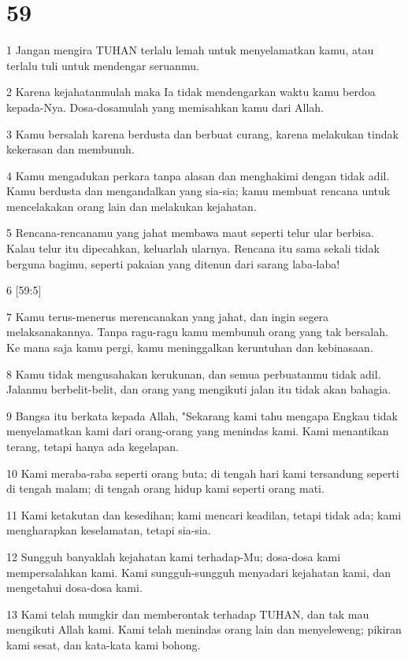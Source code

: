 \chapter{59}

\par 1 Jangan mengira TUHAN terlalu lemah untuk menyelamatkan kamu, atau terlalu tuli untuk mendengar seruanmu.
\par 2 Karena kejahatanmulah maka Ia tidak mendengarkan waktu kamu berdoa kepada-Nya. Dosa-dosamulah yang memisahkan kamu dari Allah.
\par 3 Kamu bersalah karena berdusta dan berbuat curang, karena melakukan tindak kekerasan dan membunuh.
\par 4 Kamu mengadukan perkara tanpa alasan dan menghakimi dengan tidak adil. Kamu berdusta dan mengandalkan yang sia-sia; kamu membuat rencana untuk mencelakakan orang lain dan melakukan kejahatan.
\par 5 Rencana-rencanamu yang jahat membawa maut seperti telur ular berbisa. Kalau telur itu dipecahkan, keluarlah ularnya. Rencana itu sama sekali tidak berguna bagimu, seperti pakaian yang ditenun dari sarang laba-laba!
\par 6 [59:5]
\par 7 Kamu terus-menerus merencanakan yang jahat, dan ingin segera melaksanakannya. Tanpa ragu-ragu kamu membunuh orang yang tak bersalah. Ke mana saja kamu pergi, kamu meninggalkan keruntuhan dan kebinasaan.
\par 8 Kamu tidak mengusahakan kerukunan, dan semua perbuatanmu tidak adil. Jalanmu berbelit-belit, dan orang yang mengikuti jalan itu tidak akan bahagia.
\par 9 Bangsa itu berkata kepada Allah, "Sekarang kami tahu mengapa Engkau tidak menyelamatkan kami dari orang-orang yang menindas kami. Kami menantikan terang, tetapi hanya ada kegelapan.
\par 10 Kami meraba-raba seperti orang buta; di tengah hari kami tersandung seperti di tengah malam; di tengah orang hidup kami seperti orang mati.
\par 11 Kami ketakutan dan kesedihan; kami mencari keadilan, tetapi tidak ada; kami mengharapkan keselamatan, tetapi sia-sia.
\par 12 Sungguh banyaklah kejahatan kami terhadap-Mu; dosa-dosa kami mempersalahkan kami. Kami sungguh-sungguh menyadari kejahatan kami, dan mengetahui dosa-dosa kami.
\par 13 Kami telah mungkir dan memberontak terhadap TUHAN, dan tak mau mengikuti Allah kami. Kami telah menindas orang lain dan menyeleweng; pikiran kami sesat, dan kata-kata kami bohong.

